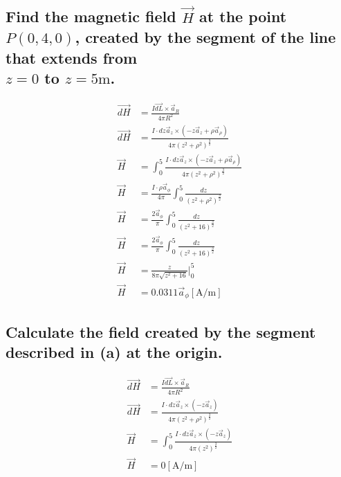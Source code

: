 \documentclass[14pt]{extarticle}
\begin{document}
\boldmath
\subsection{Find the magnetic field $\vec{H}$ at the point $P(0,4,0)$, created
	by the segment of the line that extends from \\
	$z=0$ to $z=5\mathrm{m}$.}
\unboldmath

\begin{align*}
	\overrightarrow{dH} & =\frac{I\overrightarrow{dL}\times\vec{a}_R}{4\pi R^2}                                             \\
	\overrightarrow{dH} & =\frac{I\cdot dz\vec{a}_z\times(-z\vec{a}_z+\rho\vec{a}_\rho)}{4\pi (z^2+\rho^2)^\frac32}         \\
	\vec{H}             & =\int^5_0\frac{I\cdot dz\vec{a}_z\times(-z\vec{a}_z+\rho\vec{a}_\rho)}{4\pi (z^2+\rho^2)^\frac32} \\
	\vec{H}             & =\frac{I\cdot\rho\vec{a}_\phi}{4\pi}\int^5_0\frac{dz}{(z^2+\rho^2)^\frac32}                       \\
	\vec{H}             & =\frac{2\vec{a}_\phi}{\pi}\int^5_0\frac{dz}{(z^2+16)^\frac32}                                     \\
	\vec{H}             & =\frac{2\vec{a}_\phi}{\pi}\int^5_0\frac{dz}{(z^2+16)^\frac32}                                     \\
	\vec{H}             & =\frac{z}{8\pi\sqrt{z^2+16}}\bigg|^5_0                                                            \\
	\vec{H}             & =0.0311\vec{a}_\phi\mathrm{[A/m]}
\end{align*}

\boldmath
\subsection{Calculate the field created by the segment described in (a)
	at the origin.}
\unboldmath

\begin{align*}
	\overrightarrow{dH} & =\frac{I\overrightarrow{dL}\times\vec{a}_R}{4\pi R^2}                     \\
	\overrightarrow{dH} & =\frac{I\cdot dz\vec{a}_z\times(-z\vec{a}_z)}{4\pi (z^2+\rho^2)^\frac32}  \\
	\vec{H}             & =\int^5_0\frac{I\cdot dz\vec{a}_z\times(-z\vec{a}_z)}{4\pi (z^2)^\frac32} \\
	\vec{H}             & =0\mathrm{[A/m]}
\end{align*}
\end{document}
